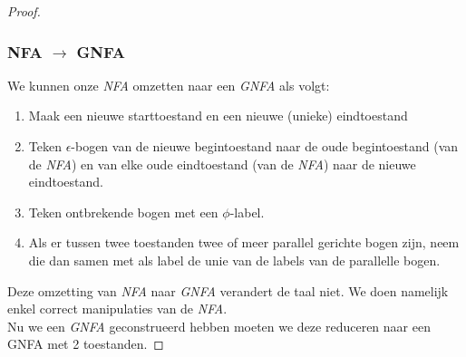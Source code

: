 \begin{proof}
\subsubsection*{NFA $\rightarrow$ GNFA}
We kunnen onze \emph{NFA} omzetten naar een \emph{GNFA} als volgt:
\begin{enumerate}
\item Maak een nieuwe starttoestand en een nieuwe (unieke) eindtoestand
\item Teken $\epsilon$-bogen van de nieuwe begintoestand naar de oude begintoestand (van de \emph{NFA}) en van elke oude eindtoestand (van de \emph{NFA}) naar de nieuwe eindtoestand.
\item Teken ontbrekende bogen met een $\phi$-label.
\item Als er tussen twee toestanden twee of meer parallel gerichte bogen zijn, neem die dan samen met als label de unie van de labels van de parallelle bogen.
\end{enumerate}
Deze omzetting van \emph{NFA} naar \emph{GNFA} verandert de taal niet. We doen namelijk enkel correct manipulaties van de \emph{NFA}.\\
Nu we een \emph{GNFA} geconstrueerd hebben moeten we deze reduceren naar een GNFA met 2 toestanden.


\end{proof}
